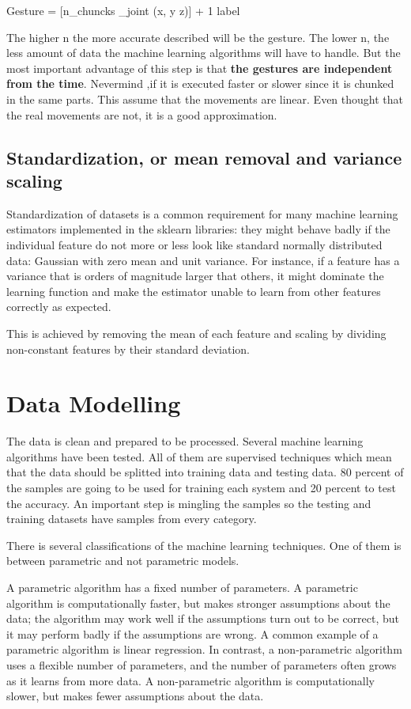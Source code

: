 Gesture = [n_{chuncks} _{joint} \times (\bigtriangleup x, \bigtriangleup y \bigtriangleup z)] + 1 label

The higher n the more accurate described will be the gesture. The lower n, the less amount of data the machine learning algorithms will have to handle. But the most important advantage of this step is that \textbf{the gestures are independent from the time}. Nevermind ,if it is executed faster or slower since it is chunked in the same parts. This assume that the movements are linear. Even thought that the real movements are not, it is a good approximation. 

\subsection{Standardization, or mean removal and variance scaling} 

Standardization of datasets is a common requirement for many machine learning estimators implemented in the sklearn libraries: they might behave badly if the individual feature do not more or less look like standard normally distributed data: Gaussian with zero mean and unit variance. 
For instance, if a feature has a variance that is orders of magnitude larger that others, it might dominate the learning function and make the estimator unable to learn from other features correctly as expected. 

This is achieved by removing the mean of each feature and scaling by dividing non-constant features by their standard deviation.

\section{Data Modelling}

The data is clean and prepared to be processed. Several machine learning algorithms have been tested. All of them are supervised techniques which mean that the data should be splitted into training data and testing data. 80 percent of the samples are going to be used for training each system and 20 percent to test the accuracy. An important step is mingling the samples so the testing and training datasets have samples from every category.\break

There is several classifications of the machine learning techniques. One of them is between parametric and not parametric models. 

A parametric algorithm has a fixed number of parameters.  A parametric algorithm is computationally faster, but makes stronger assumptions about the data; the algorithm may work well if the assumptions turn out to be correct, but it may perform badly if the assumptions are wrong.  A common example of a parametric algorithm is linear regression.
In contrast, a non-parametric algorithm uses a flexible number of parameters, and the number of parameters often grows as it learns from more data.  A non-parametric algorithm is computationally slower, but makes fewer assumptions about the data.

